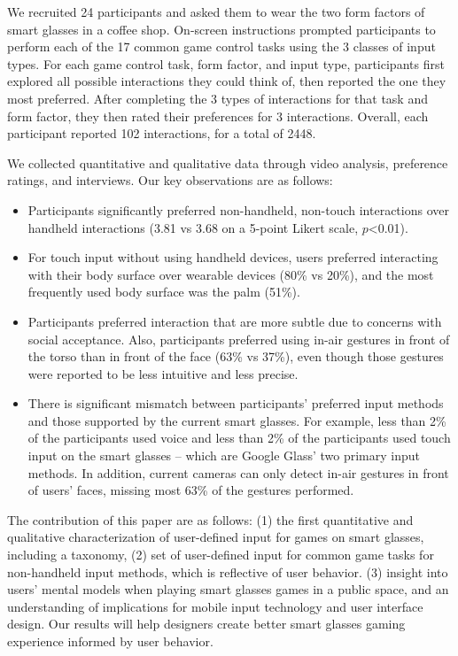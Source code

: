 \documentclass{sigchi}
\begin{document}
We recruited 24 participants and asked them to wear the two form factors of smart glasses in a coffee shop. On-screen instructions prompted participants to perform each of the 17 common game control tasks using the 3 classes of input types. For each game control task, form factor, and input type, participants first explored all possible interactions they could think of, then reported the one they most preferred. After completing the 3 types of interactions for that task and form factor, they then rated their preferences for 3 interactions.  Overall, each participant reported 102 interactions, for a total of 2448. 

We collected quantitative and qualitative data through video analysis, preference ratings, and interviews. 
Our key observations are as follows:
\begin{itemize}
  \item Participants significantly preferred non-handheld, non-touch interactions over handheld interactions (3.81  vs 3.68 on a 5-point Likert scale, $p$\textless 0.01).
  \item For touch input without using handheld devices, users preferred interacting with their body surface over wearable devices (80\% vs 20\%), and the most frequently used body surface was the palm (51\%).
  \item Participants preferred interaction that are more subtle due to concerns with social acceptance. Also, participants preferred using in-air gestures in front of the torso than in front of the face (63\% vs 37\%), even though those gestures were reported to be less intuitive and less precise.
  \item There is significant mismatch between participants' preferred input methods and those supported by the current smart glasses. For example, less than 2\% of the participants used voice and less than 2\% of the participants used touch input on the smart glasses -- which are Google Glass' two primary input methods. In addition, current cameras can only detect in-air gestures in front of users' faces, missing most 63\% of the gestures performed.
\end{itemize}


 
The contribution of this paper are as follows:
(1) the first quantitative and qualitative characterization of user-defined input for games on smart glasses, including a taxonomy, 
(2) set of user-defined input for common game tasks for non-handheld input methods, which is reflective of user behavior.
(3) insight into users' mental models when playing smart glasses games in a public space, and an understanding of implications for mobile input technology and user interface design.
Our results will help designers create better smart glasses gaming experience informed by user behavior.
\end{document}
